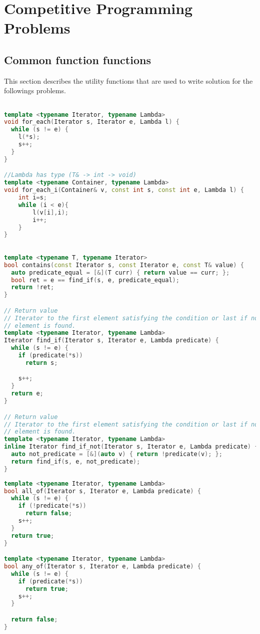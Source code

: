 \chapter{Competitive Programming Problems}
\section{Common function functions }
This section describes the utility functions that are used to write solution for the followings problems.

\begin{lstlisting}[language=c++, caption="For each functions"]

template <typename Iterator, typename Lambda>
void for_each(Iterator s, Iterator e, Lambda l) {
  while (s != e) {
    l(*s);
    s++;
  }
}

//Lambda has type (T& -> int -> void)
template <typename Container, typename Lambda>
void for_each_i(Container& v, const int s, const int e, Lambda l) {
    int i=s;
    while (i < e){
        l(v[i],i);
        i++;
    }
}
	\end{lstlisting}
	
	
	
\begin{lstlisting}[language=c++, caption="Store credit c++ solution"]

template <typename T, typename Iterator>
bool contains(const Iterator s, const Iterator e, const T& value) {
  auto predicate_equal = [&](T curr) { return value == curr; };
  bool ret = e == find_if(s, e, predicate_equal);
  return !ret;
}

// Return value
// Iterator to the first element satisfying the condition or last if no such
// element is found.
template <typename Iterator, typename Lambda>
Iterator find_if(Iterator s, Iterator e, Lambda predicate) {
  while (s != e) {
    if (predicate(*s))
      return s;

    s++;
  }
  return e;
}

// Return value
// Iterator to the first element satisfying the condition or last if no such
// element is found.
template <typename Iterator, typename Lambda>
inline Iterator find_if_not(Iterator s, Iterator e, Lambda predicate) {
  auto not_predicate = [&](auto v) { return !predicate(v); };
  return find_if(s, e, not_predicate);
}

	\end{lstlisting}



\begin{lstlisting}[language=c++, caption="Store credit c++ solution"]
template <typename Iterator, typename Lambda>
bool all_of(Iterator s, Iterator e, Lambda predicate) {
  while (s != e) {
    if (!predicate(*s))
      return false;
    s++;
  }
  return true;
}

template <typename Iterator, typename Lambda>
bool any_of(Iterator s, Iterator e, Lambda predicate) {
  while (s != e) {
    if (predicate(*s))
      return true;
    s++;
  }

  return false;
}
\end{lstlisting}





